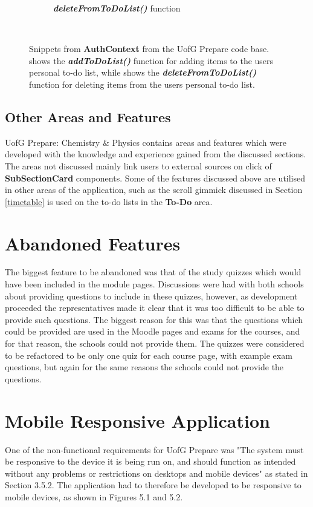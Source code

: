 \documentclass{l4proj}
\begin{document}
\begin{figure}[ht]
\begin{subfigure}[b]{0.48\textwidth}
        \caption{\textbf{\textit{deleteFromToDoList()}} function}
        \label{fig:toggleAll}
    \end{subfigure}
    ~ %
    \caption{Snippets from \textbf{AuthContext} from the UofG Prepare code base.  shows the \textbf{\textit{addToDoList()}} function for adding items to the users personal to-do list,  while  shows the \textbf{\textit{deleteFromToDoList()}} function for deleting items from the users personal to-do list.
    }\label{fig:toggle}
\end{figure}

\subsection{Other Areas and Features}
UofG Prepare: Chemistry \& Physics contains areas and features which were developed with the knowledge and experience gained from the discussed sections. The areas not discussed mainly link users to external sources on click of \textbf{SubSectionCard} components. Some of the features discussed above are utilised in other areas of the application,  such as the scroll gimmick discussed in Section \ref{timetable} is used on the to-do lists in the \textbf{To-Do} area.

\section{Abandoned Features}
The biggest feature to be abandoned was that of the study quizzes which would have been included in the module pages. Discussions were had with both schools about providing questions to include in these quizzes,  however,  as development proceeded the representatives made it clear that it was too difficult to be able to provide such questions. The biggest reason for this was that the questions which could be provided are used in the Moodle pages and exams for the courses,  and for that reason,  the schools could not provide them. The quizzes were considered to be refactored to be only one quiz for each course page,  with example exam questions,  but again for the same reasons the schools could not provide the questions.

\section{Mobile Responsive Application}
One of the non-functional requirements for UofG Prepare was "The system must be responsive to the device it is being run on,  and should function as intended without any problems or restrictions on desktops and mobile devices" as stated in Section 3.5.2. The application had to therefore be developed to be responsive to mobile devices,  as shown in Figures 5.1  and 5.2.
\end{document}
